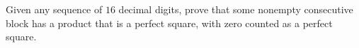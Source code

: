 Given any sequence of $16$ decimal digits, prove that some nonempty consecutive block has a product that is a perfect square, with zero counted as a perfect square.
